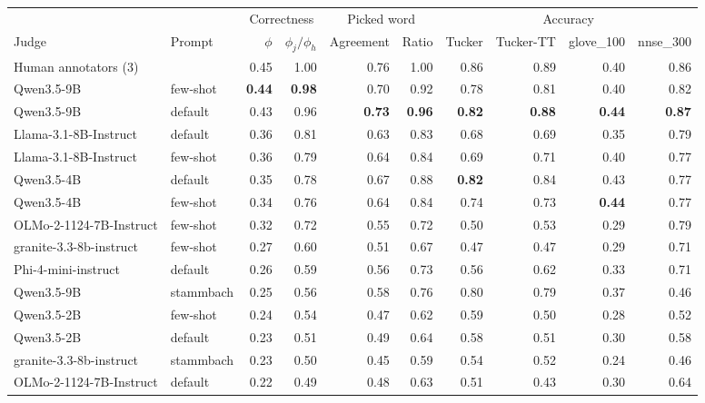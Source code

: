 \begin{table}[t]
  \centering
  \small
  \begin{tabular}{llrrrrrrrr}
    \toprule
     &  & \multicolumn{2}{c}{Correctness} & \multicolumn{2}{c}{Picked word} & \multicolumn{4}{c}{Accuracy} \\
    \cmidrule(lr){3-4} \cmidrule(lr){5-6} \cmidrule(lr){7-10}
    Judge & Prompt & $\phi$ & $\phi_j / \phi_h$ & Agreement & Ratio & Tucker & Tucker-TT & glove\_100 & nnse\_300 \\
    \midrule
    Human annotators (3) &  & 0.45 & 1.00 & 0.76 & 1.00 & 0.86 & 0.89 & 0.40 & 0.86 \\
    \midrule
    Qwen3.5-9B & few-shot & \textbf{0.44} & \textbf{0.98} & 0.70 & 0.92 & 0.78 & 0.81 & 0.40 & 0.82 \\
    Qwen3.5-9B & default & 0.43 & 0.96 & \textbf{0.73} & \textbf{0.96} & \textbf{0.82} & \textbf{0.88} & \textbf{0.44} & \textbf{0.87} \\
    Llama-3.1-8B-Instruct & default & 0.36 & 0.81 & 0.63 & 0.83 & 0.68 & 0.69 & 0.35 & 0.79 \\
    Llama-3.1-8B-Instruct & few-shot & 0.36 & 0.79 & 0.64 & 0.84 & 0.69 & 0.71 & 0.40 & 0.77 \\
    Qwen3.5-4B & default & 0.35 & 0.78 & 0.67 & 0.88 & \textbf{0.82} & 0.84 & 0.43 & 0.77 \\
    Qwen3.5-4B & few-shot & 0.34 & 0.76 & 0.64 & 0.84 & 0.74 & 0.73 & \textbf{0.44} & 0.77 \\
    OLMo-2-1124-7B-Instruct & few-shot & 0.32 & 0.72 & 0.55 & 0.72 & 0.50 & 0.53 & 0.29 & 0.79 \\
    granite-3.3-8b-instruct & few-shot & 0.27 & 0.60 & 0.51 & 0.67 & 0.47 & 0.47 & 0.29 & 0.71 \\
    Phi-4-mini-instruct & default & 0.26 & 0.59 & 0.56 & 0.73 & 0.56 & 0.62 & 0.33 & 0.71 \\
    Qwen3.5-9B & stammbach & 0.25 & 0.56 & 0.58 & 0.76 & 0.80 & 0.79 & 0.37 & 0.46 \\
    Qwen3.5-2B & few-shot & 0.24 & 0.54 & 0.47 & 0.62 & 0.59 & 0.50 & 0.28 & 0.52 \\
    Qwen3.5-2B & default & 0.23 & 0.51 & 0.49 & 0.64 & 0.58 & 0.51 & 0.30 & 0.58 \\
    granite-3.3-8b-instruct & stammbach & 0.23 & 0.50 & 0.45 & 0.59 & 0.54 & 0.52 & 0.24 & 0.46 \\
    OLMo-2-1124-7B-Instruct & default & 0.22 & 0.49 & 0.48 & 0.63 & 0.51 & 0.43 & 0.30 & 0.64 \\

\end{tabular}
\end{table}
